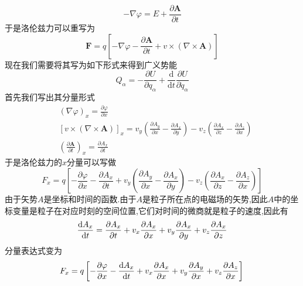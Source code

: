 \begin{equation}
	-\nabla \varphi=E+\frac{\partial \boldsymbol{A}}{\partial t}
\end{equation}
于是洛伦兹力可以重写为
\begin{equation}
	\boldsymbol{F}=q\left[-\nabla \varphi-\frac{\partial \boldsymbol{A}}{\partial t}+v \times(\nabla \times \boldsymbol{A})\right]
\end{equation}
现在我们需要将其写为如下形式来得到广义势能
\begin{equation}
	Q_{\alpha}=-\frac{\partial U}{\partial q_{\alpha}}+\frac{\mathrm d}{\mathrm d t} \frac{\partial U}{\partial \dot{q}_{\alpha}}
\end{equation}
首先我们写出其分量形式
\begin{equation}
	\begin{aligned} &(\nabla \varphi)_{x}=\frac{\partial \varphi}{\partial x} \\ &[v \times(\nabla \times \boldsymbol A)]_{x}=v_{y}\left(\frac{\partial A_{y}}{\partial x}-\frac{\partial A_{x}}{\partial y}\right)-v_{z}\left(\frac{\partial A_{x}}{\partial z}-\frac{\partial A_{z}}{\partial x}\right) \\ &\left(\frac{\partial \boldsymbol{A}}{\partial t}\right)_{x}=\frac{\partial A_{x}}{\partial t} \end{aligned}
\end{equation}
于是洛伦兹力的$ x $分量可以写做
\begin{equation}
	F_{x}=q\left[-\frac{\partial \varphi}{\partial x}-\frac{\partial A_{x}}{\partial t}+v_{y}\left(\frac{\partial A_{y}}{\partial x}-\frac{\partial A_{x}}{\partial y}\right)-v_{z}\left(\frac{\partial A_{x}}{\partial z}-\frac{\partial A_{z}}{\partial x}\right)\right]
\end{equation}
由于矢势$ A $是坐标和时间的函数.由于$ A $是粒子所在点的电磁场的矢势,因此$ A $中的坐标变量是粒子在对应时刻的空间位置,它们对时间的微商就是粒子的速度,因此有
\begin{equation}
	\frac{\mathrm{d} A_{x}}{\mathrm{d} t}=\frac{\partial A_{x}}{\partial t}+v_{x} \frac{\partial A_{x}}{\partial x}+v_{y} \frac{\partial A_{x}}{\partial y}+v_{z} \frac{\partial A_{x}}{\partial z} \\
\end{equation}
分量表达式变为
\begin{equation}
	F_{x}=q\left[-\frac{\partial \varphi}{\partial x}-\frac{\mathrm{d} A_{x}}{\mathrm{d} t}+v_{x} \frac{\partial A_{x}}{\partial x}+v_{y} \frac{\partial A_{y}}{\partial x}+v_{z} \frac{\partial A_{z}}{\partial x}\right] \\
\end{equation}
